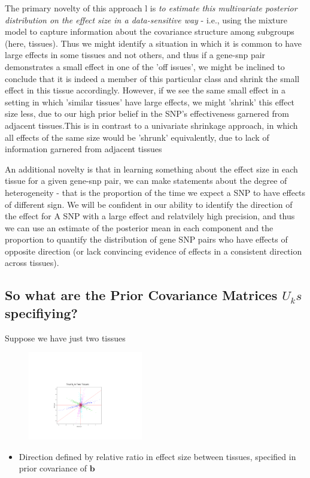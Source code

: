 \documentclass[10pt,letterpaper]{article}
\begin{document}
The primary novelty of this approach l is {\it to estimate this multivariate posterior distribution on the effect size in a data-sensitive way} - i.e., using the mixture model to capture information about the covariance structure among subgroups (here, tissues). Thus we might identify a situation in which it is common to have large effects in some tissues and not others, and thus if a gene-snp pair demonstrates a small effect in one of the 'off issues', we might be inclined to conclude that it is indeed a member of this particular class and shrink the small effect in this tissue accordingly. However, if we see the same small effect in a setting in which 'similar tissues' have large effects, we might 'shrink' this effect size less, due to our high prior belief in the SNP's effectiveness garnered from adjacent tissues.This is in contrast to a univariate shrinkage approach, in which all effects of the same size would be 'shrunk' equivalently, due to lack of information garnered from adjacent tissues 



An additional novelty is that in learning something about the effect size in each tissue for a given gene-snp pair, we can make statements about the degree of heterogeneity - that is the proportion of the time we expect a SNP to have effects of different sign. We will be confident in our ability to identify the direction of the effect for A SNP with a large effect and relatvilely high precision, and thus we can use an estimate of the posterior mean in each component and the proportion to quantify the distribution of gene SNP pairs who have effects of opposite direction (or lack convincing evidence of effects in a consistent direction across tissues).




\subsection{So what are the Prior Covariance Matrices $U_ks$ specifiying?}
Suppose we have just two tissues 

 \begin{figure}
\includegraphics[width=5cm]{snptypes}
\end{figure}
\begin{itemize}
\item Direction defined by relative ratio in effect size between tissues, specified in prior covariance of $\bm{b}$
\end{itemize}
\end{document}
